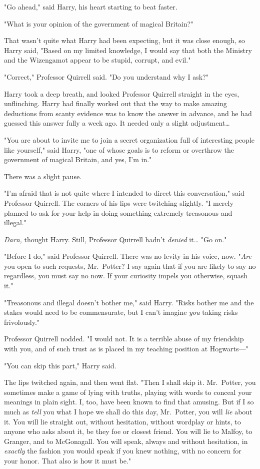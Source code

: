 "Go ahead," said Harry, his heart starting to beat faster.

"What is your opinion of the government of magical Britain?"

That wasn't quite what Harry had been expecting, but it was close enough, so
Harry said, "Based on my limited knowledge, I would say that both the Ministry
and the Wizengamot appear to be stupid, corrupt, and evil."

"Correct," Professor Quirrell said. "Do you understand why I ask?"

Harry took a deep breath, and looked Professor Quirrell straight in the eyes,
unflinching. Harry had finally worked out that the way to make amazing
deductions from scanty evidence was to know the answer in advance, and he had
guessed this answer fully a week ago. It needed only a slight adjustment{\ldots}

"You are about to invite me to join a secret organization full of interesting
people like yourself," said Harry, "one of whose goals is to reform or
overthrow the government of magical Britain, and yes, I'm in."

There was a slight pause.

"I'm afraid that is not quite where I intended to direct this conversation,"
said Professor Quirrell. The corners of his lips were twitching slightly. "I
merely planned to ask for your help in doing something extremely treasonous and
illegal."

\emph{Darn,} thought Harry. Still, Professor Quirrell hadn't \emph{denied}
it{\ldots} "Go on."

"Before I do," said Professor Quirrell. There was no levity in his voice, now.
"\emph{Are} you open to such requests, Mr.~Potter? I say again that if you are
likely to say no regardless, you must say no now. If your curiosity impels you
otherwise, squash it."

"Treasonous and illegal doesn't bother me," said Harry. "Risks bother me and
the stakes would need to be commensurate, but I can't imagine \emph{you} taking
risks frivolously."

Professor Quirrell nodded. "I would not. It is a terrible abuse of my
friendship with you, and of such trust as is placed in my teaching position at
Hogwarts---"

"You can skip this part," Harry said.

The lips twitched again, and then went flat. "Then I shall skip it. Mr.~Potter,
you sometimes make a game of lying with truths, playing with words to conceal
your meanings in plain sight. I, too, have been known to find that amusing. But
if I so much as \emph{tell} you what I hope we shall do this day, Mr.~Potter,
you will \emph{lie} about it. You will lie straight out, without hesitation,
without wordplay or hints, to anyone who asks about it, be they foe or closest
friend. You will lie to Malfoy, to Granger, and to McGonagall. You will speak,
always and without hesitation, in \emph{exactly} the fashion you would speak if
you knew nothing, with no concern for your honor. That also is how it must be."

